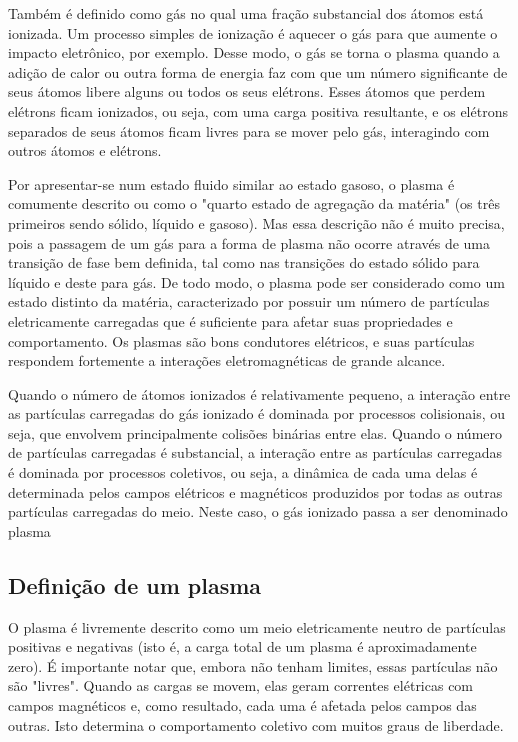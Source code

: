 \documentclass[12pt,oneside,a4paper]{abntex2}
\theoremstyle{definition}  %
\begin{document}
Também é definido como gás no qual uma fração substancial dos átomos está ionizada. Um processo simples de ionização é aquecer o gás para que aumente o impacto eletrônico, por exemplo. Desse modo, o gás se torna o plasma quando a adição de calor ou outra forma de energia faz com que um número significante de seus átomos libere alguns ou todos os seus elétrons. Esses átomos que perdem elétrons ficam ionizados, ou seja, com uma carga positiva resultante, e os elétrons separados de seus átomos ficam livres para se mover pelo gás, interagindo com outros átomos e elétrons.

Por apresentar-se num estado fluido similar ao estado gasoso, o plasma é comumente descrito ou como o "quarto estado de agregação da matéria" (os três primeiros sendo sólido, líquido e gasoso). Mas essa descrição não é muito precisa, pois a passagem de um gás para a forma de plasma não ocorre através de uma transição de fase bem definida, tal como nas transições do estado sólido para líquido e deste para gás. De todo modo, o plasma pode ser considerado como um estado distinto da matéria, caracterizado por possuir um número de partículas eletricamente carregadas que é suficiente para afetar suas propriedades e comportamento. Os plasmas são bons condutores elétricos, e suas partículas respondem fortemente a interações eletromagnéticas de grande alcance.

Quando o número de átomos ionizados é relativamente pequeno, a interação entre as partículas carregadas do gás ionizado é dominada por processos colisionais, ou seja, que envolvem principalmente colisões binárias entre elas. Quando o número de partículas carregadas é substancial, a interação entre as partículas carregadas é dominada por processos coletivos, ou seja, a dinâmica de cada uma delas é determinada pelos campos elétricos e magnéticos produzidos por todas as outras partículas carregadas do meio. Neste caso, o gás ionizado passa a ser denominado plasma

\subsection{Definição de um plasma} 

O plasma é livremente descrito como um meio eletricamente neutro de partículas positivas e negativas (isto é, a carga total de um plasma é aproximadamente zero). É importante notar que, embora não tenham limites, essas partículas não são "livres". Quando as cargas se movem, elas geram correntes elétricas com campos magnéticos e, como resultado, cada uma é afetada pelos campos das outras. Isto determina o comportamento coletivo com muitos graus de liberdade. 
\end{document}
